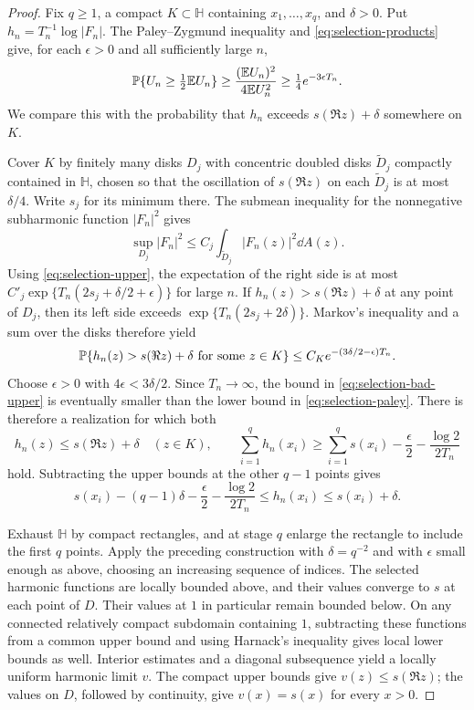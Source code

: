 \begin{proof}
Fix $q\ge1$, a compact $K\subset\mathbb H$ containing
$x_1,\ldots,x_q$, and $\delta>0$.  Put
$h_n=T_n^{-1}\log|F_n|$.
The Paley--Zygmund inequality \cite{PaleyZygmund1932} and
\eqref{eq:selection-products} give, for each $\epsilon>0$ and all
sufficiently large $n$,
\begin{equation}
 \mathbb P\{U_n\ge\tfrac12\mathbb E U_n\}
   \ge\frac{(\mathbb E U_n)^2}{4\mathbb E U_n^2}
   \ge\tfrac14 e^{-3\epsilon T_n}.
 \label{eq:selection-paley}
\end{equation}
We compare this with the probability that $h_n$ exceeds
$s(\Re z)+\delta$ somewhere on $K$.

Cover $K$ by finitely many disks $D_j$ with concentric doubled disks
$\widetilde D_j$ compactly contained in $\mathbb H$, chosen so that
the oscillation of $s(\Re z)$ on each $\widetilde D_j$ is at most
$\delta/4$.  Write $s_j$ for its minimum there.  The submean
inequality for the nonnegative subharmonic function $|F_n|^2$ gives
\[
 \sup_{D_j}|F_n|^2
    \le C_j\int_{\widetilde D_j}|F_n(z)|^2\dd A(z).
\]
Using \eqref{eq:selection-upper}, the expectation of the right side
is at most $C'_j\exp\{T_n(2s_j+\delta/2+\epsilon)\}$ for large $n$.
If $h_n(z)>s(\Re z)+\delta$ at any point of $D_j$, then its left
side exceeds $\exp\{T_n(2s_j+2\delta)\}$.  Markov's inequality and a
sum over the disks therefore yield
\begin{equation}
 \mathbb P\{h_n(z)>s(\Re z)+\delta\text{ for some }z\in K\}
       \le C_K e^{-(3\delta/2-\epsilon)T_n}.
 \label{eq:selection-bad-upper}
\end{equation}
Choose $\epsilon>0$ with $4\epsilon<3\delta/2$.  Since $T_n\to\infty$,
the bound in \eqref{eq:selection-bad-upper} is eventually smaller
than the lower bound in \eqref{eq:selection-paley}.  There is
therefore a realization for which both
\[
 h_n(z)\le s(\Re z)+\delta\quad(z\in K),\qquad
 \sum_{i=1}^q h_n(x_i)
     \ge\sum_{i=1}^q s(x_i)-\frac\epsilon2-
                                     \frac{\log2}{2T_n}
\]
hold.  Subtracting the upper bounds at the other $q-1$ points gives
\begin{equation}
 s(x_i)-(q-1)\delta-\frac\epsilon2-\frac{\log2}{2T_n}
       \le h_n(x_i)\le s(x_i)+\delta.
 \label{eq:selection-pointwise}
\end{equation}

Exhaust $\mathbb H$ by compact rectangles, and at stage $q$ enlarge
the rectangle to include the
first $q$ points.  Apply the preceding construction with
$\delta=q^{-2}$ and with $\epsilon$ small enough as above, choosing
an increasing sequence of indices.  The selected harmonic functions
are locally bounded above, and their values converge to $s$ at each
point of $D$.  Their values at $1$ in particular remain bounded
below.  On any connected relatively compact subdomain containing
$1$, subtracting these functions from a common upper bound and using
Harnack's inequality gives local lower bounds as well.  Interior
estimates and a diagonal subsequence yield a locally uniform harmonic
limit $v$.  The compact upper bounds give $v(z)\le s(\Re z)$; the
values on $D$, followed by continuity, give $v(x)=s(x)$ for every
$x>0$.
\end{proof}

